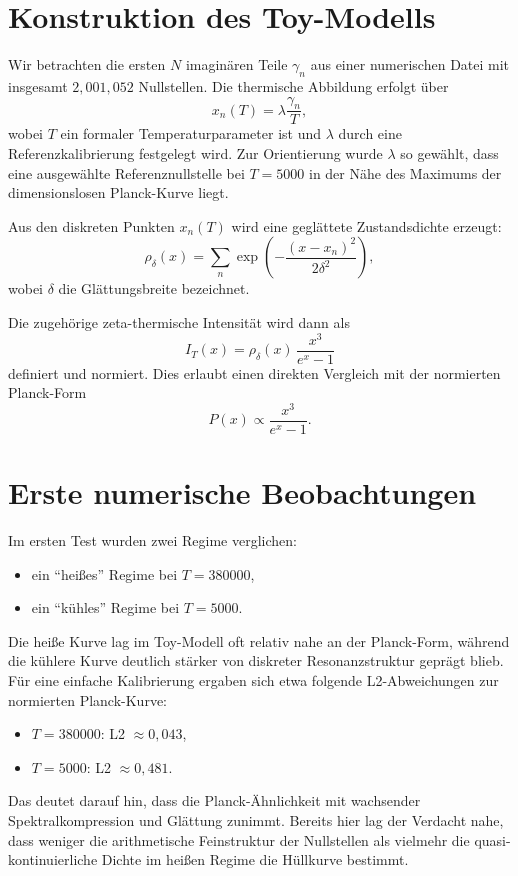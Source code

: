 \documentclass[11pt,a4paper]{article}
\theoremstyle{definition}
\theoremstyle{remark}
\begin{document}
	\section{Konstruktion des Toy-Modells}
	
	Wir betrachten die ersten $N$ imaginären Teile $\gamma_n$ aus einer numerischen Datei mit insgesamt $2{,}001{,}052$ Nullstellen. Die thermische Abbildung erfolgt über
	\[
	x_n(T)=\lambda \frac{\gamma_n}{T},
	\]
	wobei $T$ ein formaler Temperaturparameter ist und $\lambda$ durch eine Referenzkalibrierung festgelegt wird. Zur Orientierung wurde $\lambda$ so gewählt, dass eine ausgewählte Referenznullstelle bei $T=5000$ in der Nähe des Maximums der dimensionslosen Planck-Kurve liegt.
	
	Aus den diskreten Punkten $x_n(T)$ wird eine geglättete Zustandsdichte erzeugt:
	\[
	\rho_\delta(x)=\sum_n \exp\!\left(-\frac{(x-x_n)^2}{2\delta^2}\right),
	\]
	wobei $\delta$ die Glättungsbreite bezeichnet.
	
	Die zugehörige zeta-thermische Intensität wird dann als
	\[
	I_T(x)=\rho_\delta(x)\,\frac{x^3}{e^x-1}
	\]
	definiert und normiert. Dies erlaubt einen direkten Vergleich mit der normierten Planck-Form
	\[
	P(x)\propto \frac{x^3}{e^x-1}.
	\]
	
	\section{Erste numerische Beobachtungen}
	
	Im ersten Test wurden zwei Regime verglichen:
	\begin{itemize}[leftmargin=1.5em]
		\item ein ``heißes'' Regime bei $T=380000$,
		\item ein ``kühles'' Regime bei $T=5000$.
	\end{itemize}
	
	Die heiße Kurve lag im Toy-Modell oft relativ nahe an der Planck-Form, während die kühlere Kurve deutlich stärker von diskreter Resonanzstruktur geprägt blieb. Für eine einfache Kalibrierung ergaben sich etwa folgende L2-Abweichungen zur normierten Planck-Kurve:
	\begin{itemize}[leftmargin=1.5em]
		\item $T=380000$: L2 $\approx 0{,}043$,
		\item $T=5000$: L2 $\approx 0{,}481$.
	\end{itemize}
	
	Das deutet darauf hin, dass die Planck-Ähnlichkeit mit wachsender Spektralkompression und Glättung zunimmt. Bereits hier lag der Verdacht nahe, dass weniger die arithmetische Feinstruktur der Nullstellen als vielmehr die quasi-kontinuierliche Dichte im heißen Regime die Hüllkurve bestimmt.
	
\end{document}
